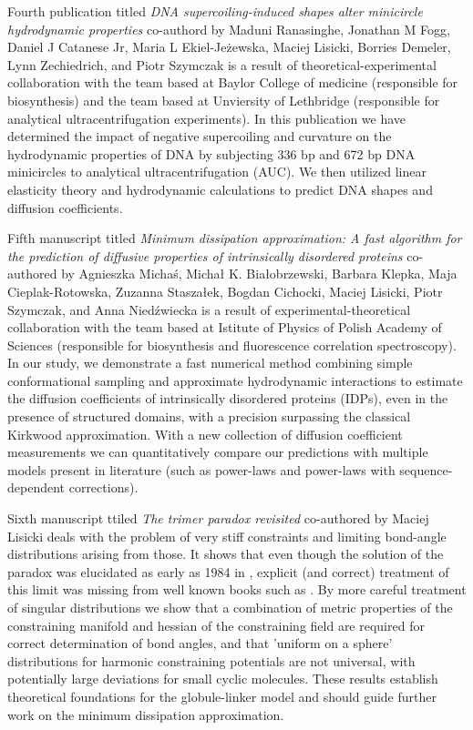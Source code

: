 \documentclass{doctoral}
\begin{document}
Fourth publication titled \emph{DNA supercoiling-induced shapes alter minicircle hydrodynamic properties} 
co-authord by Maduni Ranasinghe, Jonathan M Fogg, Daniel J Catanese Jr, Maria L Ekiel-Jeżewska, Maciej Lisicki, Borries Demeler, Lynn Zechiedrich, and Piotr Szymczak 
is a result of theoretical-experimental collaboration with the team based at Baylor College of medicine (responsible for biosynthesis) and the team based at Unviersity of Lethbridge (responsible for analytical ultracentrifugation experiments). 
In this publication we have determined the impact of negative supercoiling and curvature on the hydrodynamic properties of DNA by subjecting 336 bp and 672 bp DNA minicircles to analytical ultracentrifugation (AUC). We then utilized linear elasticity theory and hydrodynamic calculations to predict DNA shapes and diffusion coefficients.

Fifth manuscript titled \emph{Minimum dissipation approximation: A fast algorithm for the prediction of diffusive properties of intrinsically disordered proteins} 
co-authored by Agnieszka Michaś, Michał K. Białobrzewski, Barbara Klepka, Maja Cieplak-Rotowska, Zuzanna Staszałek, Bogdan Cichocki, Maciej Lisicki, Piotr Szymczak, and Anna Niedźwiecka 
is a result of experimental-theoretical collaboration with the team based at Istitute of Physics of Polish Academy of Sciences (responsible for biosynthesis and fluorescence correlation spectroscopy). 
In our study, we demonstrate a fast numerical method combining simple conformational sampling and approximate hydrodynamic interactions to estimate the diffusion coefficients of intrinsically disordered proteins (IDPs), even in the presence of structured domains, with a precision surpassing the classical Kirkwood approximation. With a new collection of diffusion coefficient measurements we can quantitatively compare our predictions with multiple models present in literature (such as power-laws and power-laws with sequence-dependent corrections).

Sixth manuscript ttiled \emph{The trimer paradox revisited} 
co-authored by Maciej Lisicki
deals with the problem of very stiff constraints and limiting bond-angle distributions arising from those. It shows that even though the solution of the paradox was elucidated as early as 1984 in \textcite{van_Kampen_1984}, explicit (and correct) treatment of this limit was missing from well known books such as \textcite{Frenkel_2002}. By more careful treatment of singular distributions we show that a combination of metric properties of the constraining manifold and hessian of the constraining field are required for correct determination of bond angles, and that 'uniform on a sphere' distributions for harmonic constraining potentials are not universal, with potentially large deviations for small cyclic molecules. These results establish theoretical foundations for the globule-linker model and should guide further work on the minimum dissipation approximation.
\end{document}
